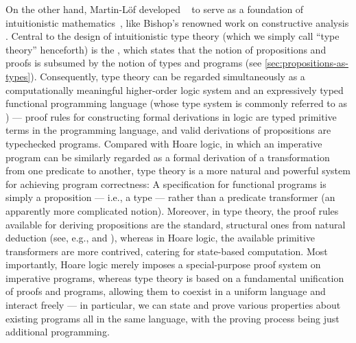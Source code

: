 On the other hand, Martin-Löf developed ~\citep{ML-TT73, ML-TT84, Nordstrom-programming} to serve as a foundation of intuitionistic mathematics~\citep{Heyting-intuitionism, Dummett-intuitionism}, like Bishop's renowned work on constructive analysis \citep{Bishop-analysis}.
Central to the design of intuitionistic type theory (which we simply call ``type theory'' henceforth) is the , which states that the notion of propositions and proofs is subsumed by the notion of types and programs (see \autoref{sec:propositions-as-types}).
Consequently, type theory can be regarded simultaneously as a computationally meaningful higher-order logic system and an expressively typed functional programming language (whose type system is commonly referred to as ) --- proof rules for constructing formal derivations in logic are typed primitive terms in the programming language, and valid derivations of propositions are typechecked programs.
Compared with Hoare logic, in which an imperative program can be similarly regarded as a formal derivation of a transformation from one predicate to another, type theory is a more natural and powerful system for achieving program correctness:
A specification for functional programs is simply a proposition --- i.e., a type --- rather than a predicate transformer (an apparently more complicated notion).
Moreover, in type theory, the proof rules available for deriving propositions are the standard, structural ones from natural deduction (see, e.g., \citet{Girard-proofs-and-types} and \citet{vanDalen-logic}), whereas in Hoare logic, the available primitive transformers are more contrived, catering for state-based computation.
Most importantly, Hoare logic merely imposes a special-purpose proof system on imperative programs, whereas type theory is based on a fundamental unification of proofs and programs, allowing them to coexist in a uniform language and interact freely --- in particular, we can state and prove various properties about existing programs all in the same language, with the proving process being just additional programming.

